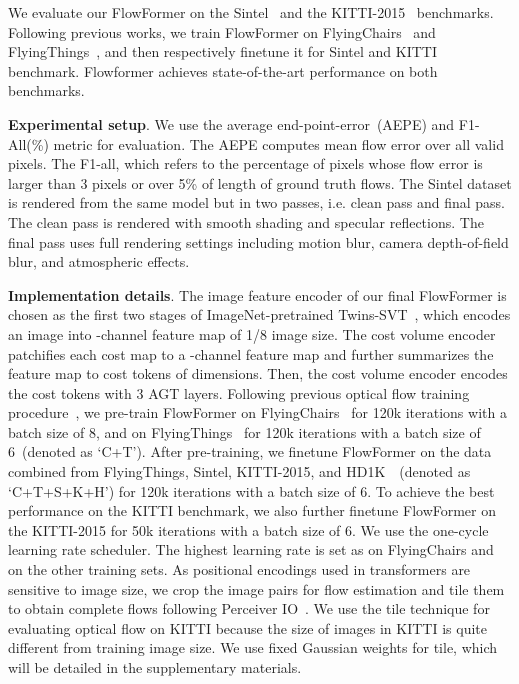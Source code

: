 We evaluate our FlowFormer on the Sintel~\cite{butler2012naturalistic} and the KITTI-2015~\cite{geiger2013vision} benchmarks.
Following previous works, we train FlowFormer on FlyingChairs~\cite{dosovitskiy2015flownet} and FlyingThings~\cite{mayer2016large}, and then respectively finetune it for Sintel and KITTI benchmark.
Flowformer achieves state-of-the-art performance on both benchmarks.

\noindent \textbf{Experimental setup}.
We use the average end-point-error~(AEPE) and F1-All(\%) metric for evaluation.
The AEPE computes mean flow error over all valid pixels.
The F1-all, which refers to the percentage of pixels whose flow error is larger than 3 pixels or over 5\% of length of ground truth flows.
The Sintel dataset is rendered from the same model but in two passes, i.e. clean pass and final pass.
The clean pass is rendered with smooth shading and specular reflections.
The final pass uses full rendering settings including motion blur, camera depth-of-field blur, and atmospheric effects.

\noindent \textbf{Implementation details}.
The image feature encoder of our final FlowFormer is chosen as the first two stages of ImageNet-pretrained Twins-SVT~\cite{chu2021twins}, which encodes an image into -channel feature map of 1/8 image size. The cost volume encoder patchifies each cost map to a -channel feature map and further summarizes the feature map to  cost tokens of  dimensions.
Then, the cost volume encoder encodes the cost tokens with 3 AGT layers.
Following previous optical flow training procedure~\cite{jiang2021learning}, we pre-train FlowFormer on FlyingChairs~\cite{dosovitskiy2015flownet} for 120k iterations with a batch size of 8, and on FlyingThings~\cite{mayer2016large} for 120k iterations with a batch size of 6~(denoted as `C+T').
After pre-training, we finetune FlowFormer on the data combined from FlyingThings, Sintel, KITTI-2015, and HD1K~\cite{kondermann2016hci}~(denoted as `C+T+S+K+H') for 120k iterations with a batch size of 6.
To achieve the best performance on the KITTI benchmark, we also further finetune FlowFormer on the KITTI-2015 for 50k iterations with a batch size of 6.
We use the one-cycle learning rate scheduler. The highest learning rate is set as  on FlyingChairs and  on the other training sets.
As positional encodings used in transformers are sensitive to image size, we crop the image pairs for flow estimation and tile them to obtain complete flows following Perceiver IO~\cite{jaegle2021perceiver}. 
We use the tile technique for evaluating optical flow on KITTI because the size of images in KITTI is quite different from training image size.
We use fixed Gaussian weights for tile, which will be detailed in the supplementary materials.


